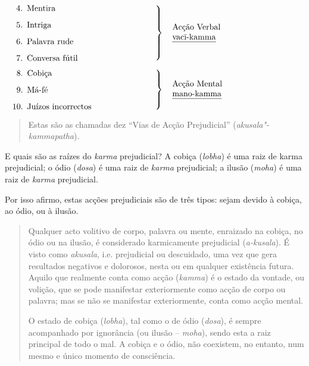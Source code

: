\bigskip

$\left.
\begin{minipage}{0.52\linewidth}
\raggedright
\begin{enumerate}
\setcounter{enumi}{3}
  \item Mentira
  \item Intriga
  \item Palavra rude
  \item Conversa fútil
\end{enumerate}
\end{minipage}
\right\}
\hspace*{10pt}\parbox{0.4\linewidth}{Acção Verbal\\ \emph{vacī-kamma}}
$

\bigskip

$\left.
\begin{minipage}{0.52\linewidth}
\raggedright
\begin{enumerate}
\setcounter{enumi}{7}
  \item Cobiça
  \item Má-fé
  \item Juízos incorrectos
\end{enumerate}
\end{minipage}
\right\}
\hspace*{10pt}\parbox{0.4\linewidth}{Acção Mental\\ \emph{mano-kamma}}
$

\begin{quote}
  Estas são as chamadas dez “Vias de Acção Prejudicial” (\emph{akusala"-kammapatha}).
\end{quote}

E quais são as raízes do \emph{karma} prejudicial? A cobiça (\emph{lobha}) é uma
raiz de karma prejudicial; o ódio (\emph{dosa}) é uma raiz de \emph{karma}
prejudicial; a ilusão (\emph{moha}) é uma raiz de \emph{karma} prejudicial.

Por isso afirmo, estas acções prejudiciais são de três tipos: sejam devido à
cobiça, ao ódio, ou à ilusão.

\begin{quote}
  Qualquer acto volitivo de corpo, palavra ou mente, enraizado na cobiça, no
  ódio ou na ilusão, é considerado karmicamente prejudicial (\emph{a-kusala}). É
  visto como \emph{akusala}, i.e. prejudicial ou descuidado, uma vez que gera
  resultados negativos e dolorosos, nesta ou em qualquer existência futura.
  Aquilo que realmente conta como acção (\emph{kamma}) é o estado da vontade, ou
  volição, que se pode manifestar exteriormente como acção de corpo ou palavra;
  mas se não se manifestar exteriormente, conta como acção mental.

  O estado de cobiça (\emph{lobha}), tal como o de ódio (\emph{dosa}), é sempre
  acompanhado por ignorância (ou ilusão -- \emph{moha}), sendo esta a raiz
  principal de todo o mal. A cobiça e o ódio, não coexistem, no entanto, num
  mesmo e único momento de consciência.
\end{quote}

